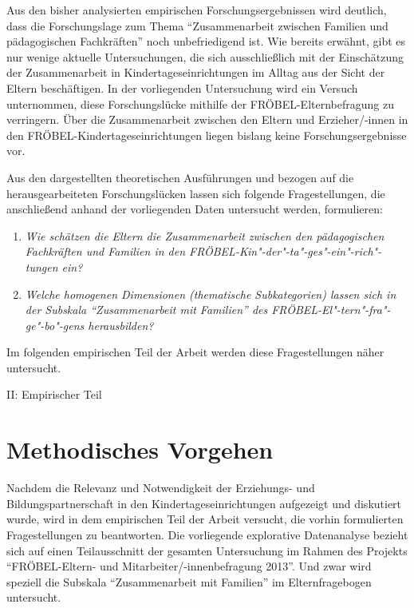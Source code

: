 \documentclass[12pt,a4paper]{article}
\begin{document}
Aus den bisher analysierten empirischen Forschungsergebnissen wird deutlich, dass die Forschungslage zum Thema "`Zusammenarbeit zwischen Familien und pädagogischen Fachkräften"' noch unbefriedigend ist. Wie bereits erwähnt, gibt es nur wenige aktuelle Untersuchungen, die sich ausschließlich mit der Einschätzung der Zusammenarbeit in Kindertageseinrichtungen im Alltag aus der Sicht der Eltern beschäftigen. In der vorliegenden Untersuchung wird ein Versuch unternommen, diese Forschungslücke mithilfe der FRÖBEL-Elternbefragung zu verringern. Über die Zusammenarbeit zwischen den Eltern und Erzieher/-innen in den FRÖBEL-Kindertageseinrichtungen liegen bislang keine Forschungsergebnisse vor.

	Aus den dargestellten theoretischen Ausführungen und bezogen auf die herausgearbeiteten Forschungslücken lassen sich folgende Fragestellungen, die anschließend anhand der vorliegenden Daten untersucht werden, formulieren:
	\pagebreak
\begin{enumerate}

\item \textit{ Wie schätzen die Eltern die Zusammenarbeit zwischen den pädagogischen Fachkräften und Familien in den FRÖBEL-Kin"-der"-ta"-ges"-ein"-rich"-tungen ein?}

\item \textit{Welche homogenen Dimensionen (thematische Subkategorien) lassen sich in der Subskala "`Zusammenarbeit mit Familien"' des FRÖBEL-El"-tern"-fra"-ge"-bo"-gens herausbilden?}
\end{enumerate}
Im folgenden empirischen Teil der Arbeit werden diese Fragestellungen näher untersucht.

\pagebreak
\vspace*{\fill}
\begin{Huge}
\begin{center}
II: Empirischer Teil
\end{center}
\end{Huge}
\vspace*{\fill}
\pagebreak

\section{Methodisches Vorgehen}
Nachdem die Relevanz und Notwendigkeit der Erziehungs- und Bildungspartnerschaft in den Kindertageseinrichtungen aufgezeigt und diskutiert wurde, wird in dem empirischen Teil der Arbeit versucht, die vorhin formulierten Fragestellungen zu beantworten. Die vorliegende explorative Datenanalyse bezieht sich auf einen Teilausschnitt der gesamten Untersuchung im Rahmen des Projekts "`FRÖBEL-Eltern- und Mitarbeiter/-innenbefragung 2013"'. Und zwar   wird speziell die Subskala "`Zusammenarbeit mit Familien"' im Elternfragebogen untersucht.
\end{document}
